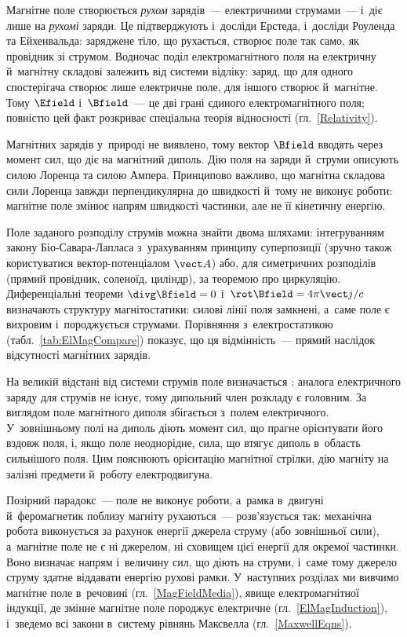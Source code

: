 Магнітне поле створюється \emph{рухом} зарядів~--- електричними струмами~--- і~діє лише
на \emph{рухомі} заряди. Це підтверджують і~досліди Ерстеда, і~досліди Роуленда та
Ейхенвальда: заряджене тіло, що рухається, створює поле так само, як провідник зі струмом.
Водночас поділ електромагнітного поля на електричну й~магнітну складові залежить від
системи відліку: заряд, що для одного спостерігача створює лише електричне поле, для
іншого створює й~магнітне. Тому $\Efield$ і~$\Bfield$~--- це дві грані єдиного
електромагнітного поля; повністю цей факт розкриває спеціальна теорія відносності
(гл.~\ref{Relativity}).

Магнітних зарядів у~природі не виявлено, тому вектор $\Bfield$ вводять через момент сил,
що діє на магнітний диполь. Дію поля на заряди й~струми описують силою Лоренца та силою
Ампера. Принципово важливо, що магнітна складова сили Лоренца завжди перпендикулярна до
швидкості й~тому не виконує роботи: магнітне поле змінює напрям швидкості частинки, але не
її кінетичну енергію.

Поле заданого розподілу струмів можна знайти двома шляхами: інтегруванням закону
Біо-Савара-Лапласа з~урахуванням принципу суперпозиції (зручно також користуватися
вектор-потенціалом $\vect A$) або, для симетричних розподілів (прямий провідник, соленоїд,
циліндр), за теоремою про циркуляцію. Диференціальні теореми $\divg\Bfield=0$
і~$\rot\Bfield=4\pi\vect j/c$ визначають структуру магнітостатики: силові лінії поля
замкнені, а~саме поле є вихровим і~породжується струмами. Порівняння з~електростатикою
(табл.~\ref{tab:ElMagCompare}) показує, що ця відмінність~--- прямий наслідок відсутності
магнітних зарядів.

На великій відстані від системи струмів поле визначається :
аналога електричного заряду для струмів не існує, тому дипольний член розкладу є головним.
За виглядом поле магнітного диполя збігається з~полем електричного. У~зовнішньому полі на
диполь діють момент сил, що прагне орієнтувати його вздовж поля, і, якщо поле неоднорідне,
сила, що втягує диполь в~область сильнішого поля. Цим пояснюють орієнтацію магнітної
стрілки, дію магніту на залізні предмети й~роботу електродвигуна.

Позірний парадокс~--- поле не виконує роботи, а~рамка в~двигуні й~феромагнетик поблизу
магніту рухаються~--- розв'язується так: механічна робота виконується за рахунок енергії
джерела струму (або зовнішньої сили), а~магнітне поле не є ні джерелом, ні сховищем цієї
енергії для окремої частинки. Воно визначає напрям і~величину сил, що діють на струми,
і~саме тому джерело струму здатне віддавати енергію рухові рамки. У~наступних розділах ми
вивчимо магнітне поле в~речовині (гл.~\ref{MagFieldMedia}), явище електромагнітної
індукції, де змінне магнітне поле породжує електричне (гл.~\ref{ElMagInduction}),
і~зведемо всі закони в~систему рівнянь Максвелла (гл.~\ref{MaxwellEqns}).


